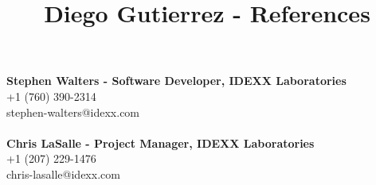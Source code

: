 \documentclass[10pt]{article}
\title{Diego Gutierrez - References}
\date{}
\author{}
\makeatletter
\renewcommand{\maketitle}{\bgroup\setlength{\parindent}{0pt}
	\begin{flushleft}
		\LARGE\textbf{\@title}
		
		\normalsize\@author
	\end{flushleft}\egroup
}
\makeatother
\begin{document}
\maketitle
\thispagestyle{empty} %
\noindent\textbf{Stephen Walters - Software Developer, IDEXX Laboratories}\\
\normalsize +1 (760) 390-2314 \\
stephen-walters@idexx.com \\
\\
\noindent\textbf{Chris LaSalle - Project Manager, IDEXX Laboratories}\\
\normalsize +1 (207) 229-1476\\
chris-lasalle@idexx.com\\
\end{document}
